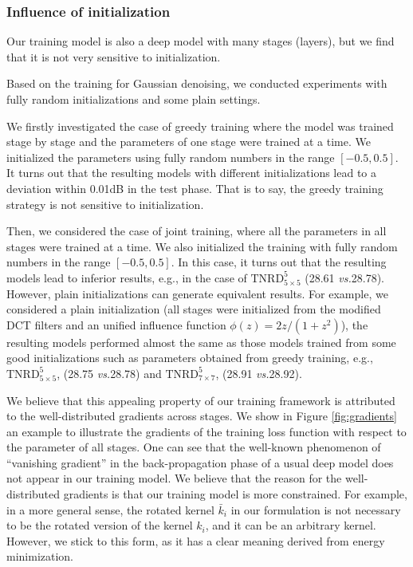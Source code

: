 \documentclass[10pt,journal,compsoc]{IEEEtran}
\newcommand{\vs}{\emph{vs.}}
\begin{document}
\subsubsection{Influence of initialization}
Our training model is also a deep model with many stages (layers), but we find that it 
is not very sensitive to initialization. 
{Based on the training for Gaussian denoising, 
we conducted experiments with fully random initializations and some plain settings. 

We firstly investigated the case of greedy training where the model was trained 
stage by stage and the parameters of one stage 
were trained at a time. We initialized the parameters using fully random numbers 
in the range $[-0.5, 0.5]$. It turns out that the resulting models with different 
initializations lead to a deviation within 0.01dB in the test phase. That is to say, 
the greedy training strategy is not sensitive to initialization. 

Then, we considered the case of joint training, where all the parameters 
in all stages were trained at a time. 
We also initialized the training with 
fully random numbers in the range $[-0.5, 0.5]$. 
In this case, it turns out that the resulting 
models lead to inferior results, 
e.g., in the case of $\text{TNRD}^5_{5\times 5}$ (28.61 \vs 28.78). 
However, plain initializations can generate equivalent results. For example, 
we considered a plain initialization (all stages were initialized from the modified 
DCT filters and an unified influence function $\phi(z) = 2z/(1+z^2)$), the 
resulting models performed almost the same as those models trained from some 
good initializations such as parameters obtained from greedy training, 
e.g.,$\text{TNRD}^5_{5\times 5}$, (28.75 \vs 28.78) and 
$\text{TNRD}^5_{7\times 7}$, (28.91 \vs 28.92).} 

We believe that this appealing property of our training framework is attributed to the well-distributed gradients across stages. 
We show in Figure \ref{fig:gradients} an example to illustrate 
the gradients of the training loss function with respect to the parameter of all stages. 
One can see that the well-known phenomenon of ``vanishing gradient'' \cite{bengio1994learning} in the back-propagation phase 
of a usual deep model does not appear in our training model. We believe that the 
reason for the well-distributed gradients is that our training model is 
more constrained. For example, in a more general sense, the rotated kernel $\bar k_i$ in our formulation is not necessary to be 
the rotated version of the kernel $k_i$, and it can be an arbitrary kernel. However, we stick to this form, as it has a clear meaning 
derived from energy minimization. 
\end{document}
